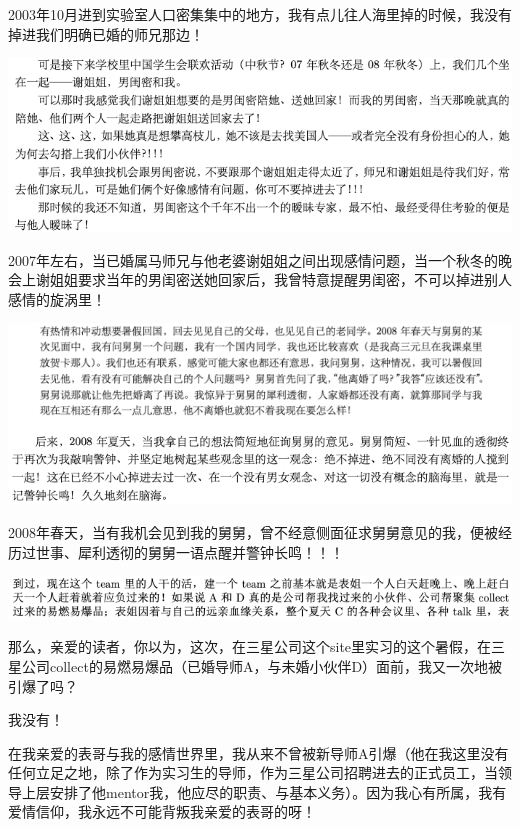 \documentclass[9pt, b5paper]{article}
\begin{document}
2003年10月进到实验室人口密集集中的地方，我有点儿往人海里掉的时候，我没有掉进我们明确已婚的师兄那边！

\begin{center}
\includegraphics[width=.9\linewidth]{./pic/backups_plans_20210511_122514.png}
\end{center}

2007年左右，当已婚属马师兄与他老婆谢姐姐之间出现感情问题，当一个秋冬的晚会上谢姐姐要求当年的男闺密送她回家后，我曾特意提醒男闺密，不可以掉进别人感情的旋涡里！

\begin{center}
\includegraphics[width=.9\linewidth]{./pic/backups_plans_20210511_122431.png}
\end{center}

2008年春天，当有我机会见到我的舅舅，曾不经意侧面征求舅舅意见的我，便被经历过世事、犀利透彻的舅舅一语点醒并警钟长鸣！！！

\begin{center}
\includegraphics[width=.9\linewidth]{./pic/backups_plans_20210511_123400.png}
\end{center}

那么，亲爱的读者，你以为，这次，在三星公司这个site里实习的这个暑假，在三星公司collect的易燃易爆品（已婚导师A，与未婚小伙伴D）面前，我又一次地被引爆了吗？

我没有！

在我亲爱的表哥与我的感情世界里，我从来不曾被新导师A引爆（他在我这里没有任何立足之地，除了作为实习生的导师，作为三星公司招聘进去的正式员工，当领导上层安排了他mentor我，他应尽的职责、与基本义务）。因为我心有所属，我有爱情信仰，我永远不可能背叛我亲爱的表哥的呀！
\end{document}
